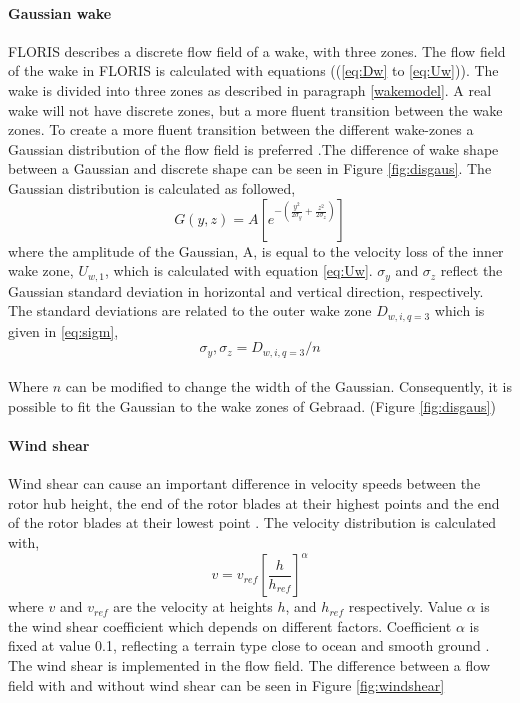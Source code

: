 \paragraph{Gaussian wake}
FLORIS describes a discrete flow field of a wake, with three zones. The flow field of the wake in FLORIS is calculated with equations ((\ref{eq:Dw} to \ref{eq:Uw})). The wake is divided into three zones as described in paragraph \ref{wakemodel}. A real wake will not have discrete zones, but a more fluent transition between the wake zones. To create a more fluent transition between the different wake-zones a Gaussian distribution of the flow field is preferred \cite{Bastankhah2016}.The difference of wake shape between a Gaussian and discrete shape can be seen in Figure \ref{fig:disgaus}.  The Gaussian distribution is calculated as followed, 
\begin{equation}
\label{eq:gaus}
G(y, z) = A [e^{-(\frac{y^2}{2\sigma_y} + \frac{z^2}{2\sigma_z})}]
\end{equation}
where the amplitude of the Gaussian, A, is equal to the velocity loss of the inner wake zone, $U_{w,1}$, which is calculated with equation \ref{eq:Uw}. $\sigma_y$ and $\sigma_z$ reflect the Gaussian standard deviation in horizontal and vertical direction, respectively. The standard deviations are related to the outer wake zone $D_{w,i,q=3}$ which is given in \ref{eq:sigm},
\begin{equation}
\label{eq:sigm}
\sigma_y,\sigma_z = D_{w,i,q=3}/n 
\end{equation}
\\
Where $n$ can be modified to change the width of the Gaussian. Consequently, it is possible to fit the Gaussian to the wake zones of Gebraad. (Figure \ref{fig:disgaus})


\paragraph{Wind shear}
Wind shear can cause an important difference in velocity speeds between the rotor hub height, the end of the rotor blades at their highest points and the end of the rotor blades at their lowest point \cite{Firtin2011}.  The velocity distribution is calculated with, 
\begin{equation}
\label{eq:shear}
v = v_{ref} \left[\frac{h}{h_{ref}}\right]^\alpha
\end{equation}
where $v$ and $v_{ref}$ are the velocity at heights $h$, and $h_{ref}$  respectively. Value $\alpha$ is the wind shear coefficient which depends on different factors. Coefficient $\alpha$ is fixed at value 0.1, reflecting a terrain type close to ocean and smooth ground \cite{Firtin2011}. The wind shear is implemented in the flow field. The difference between a flow field with and without wind shear can be seen in Figure \ref{fig:windshear}

